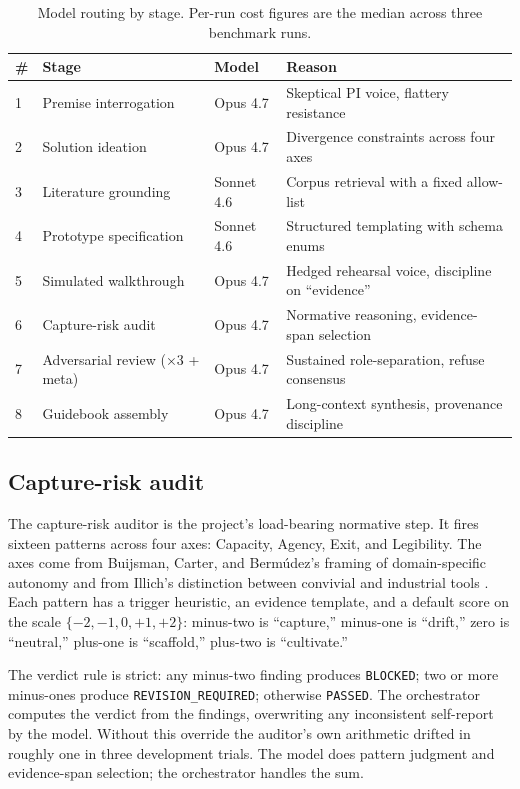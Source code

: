 \begin{table}[ht]
\centering
\small
\caption{Model routing by stage. Per-run cost figures are the median across three benchmark runs.}
\label{tab:routing}
\begin{tabular}{@{}llll@{}}
\toprule
\# & Stage & Model & Reason \\
\midrule
1 & Premise interrogation & Opus 4.7 & Skeptical PI voice, flattery resistance \\
2 & Solution ideation & Opus 4.7 & Divergence constraints across four axes \\
3 & Literature grounding & Sonnet 4.6 & Corpus retrieval with a fixed allow-list \\
4 & Prototype specification & Sonnet 4.6 & Structured templating with schema enums \\
5 & Simulated walkthrough & Opus 4.7 & Hedged rehearsal voice, discipline on ``evidence'' \\
6 & Capture-risk audit & Opus 4.7 & Normative reasoning, evidence-span selection \\
7 & Adversarial review (×3 + meta) & Opus 4.7 & Sustained role-separation, refuse consensus \\
8 & Guidebook assembly & Opus 4.7 & Long-context synthesis, provenance discipline \\
\bottomrule
\end{tabular}
\end{table}

\subsection{Capture-risk audit}

The capture-risk auditor is the project's load-bearing normative step. It fires sixteen patterns across four axes: Capacity, Agency, Exit, and Legibility. The axes come from Buijsman, Carter, and Bermúdez's framing of domain-specific autonomy \citep{buijsman2025autonomy} and from Illich's distinction between convivial and industrial tools \citep{illich1973conviviality}. Each pattern has a trigger heuristic, an evidence template, and a default score on the scale $\{-2, -1, 0, +1, +2\}$: minus-two is ``capture,'' minus-one is ``drift,'' zero is ``neutral,'' plus-one is ``scaffold,'' plus-two is ``cultivate.''

The verdict rule is strict: any minus-two finding produces \texttt{BLOCKED}; two or more minus-ones produce \texttt{REVISION\_REQUIRED}; otherwise \texttt{PASSED}. The orchestrator computes the verdict from the findings, overwriting any inconsistent self-report by the model. Without this override the auditor's own arithmetic drifted in roughly one in three development trials. The model does pattern judgment and evidence-span selection; the orchestrator handles the sum.

